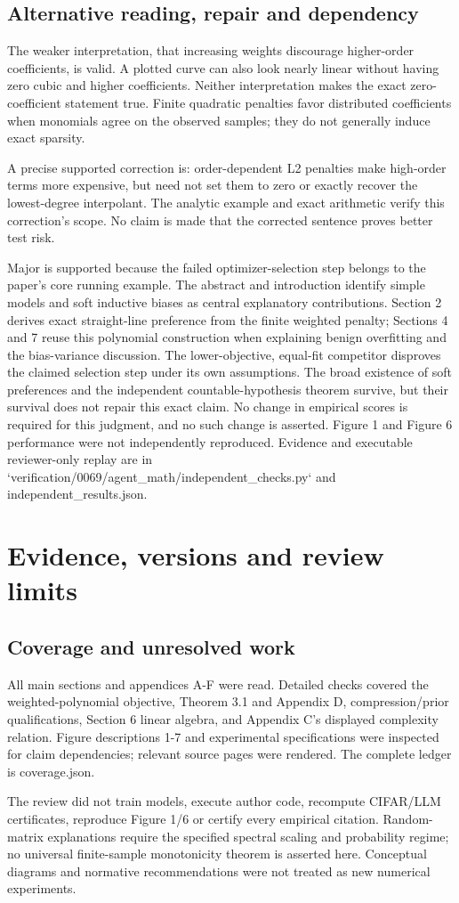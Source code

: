 \documentclass[10pt]{article}
\begin{document}
\subsection*{Alternative reading, repair and dependency}
The weaker interpretation, that increasing weights discourage higher-order coefficients, is valid. A plotted curve can also look nearly linear without having zero cubic and higher coefficients. Neither interpretation makes the exact zero-coefficient statement true. Finite quadratic penalties favor distributed coefficients when monomials agree on the observed samples; they do not generally induce exact sparsity.\par
A precise supported correction is: order-dependent L2 penalties make high-order terms more expensive, but need not set them to zero or exactly recover the lowest-degree interpolant. The analytic example and exact arithmetic verify this correction’s scope. No claim is made that the corrected sentence proves better test risk.\par
Major is supported because the failed optimizer-selection step belongs to the paper’s core running example. The abstract and introduction identify simple models and soft inductive biases as central explanatory contributions. Section 2 derives exact straight-line preference from the finite weighted penalty; Sections 4 and 7 reuse this polynomial construction when explaining benign overfitting and the bias-variance discussion. The lower-objective, equal-fit competitor disproves the claimed selection step under its own assumptions. The broad existence of soft preferences and the independent countable-hypothesis theorem survive, but their survival does not repair this exact claim. No change in empirical scores is required for this judgment, and no such change is asserted. Figure 1 and Figure 6 performance were not independently reproduced. Evidence and executable reviewer-only replay are in `verification/0069/agent\_math/independent\_checks.py` and independent\_results.json.\par
\section*{Evidence, versions and review limits}
\subsection*{Coverage and unresolved work}
All main sections and appendices A-F were read. Detailed checks covered the weighted-polynomial objective, Theorem 3.1 and Appendix D, compression/prior qualifications, Section 6 linear algebra, and Appendix C’s displayed complexity relation. Figure descriptions 1-7 and experimental specifications were inspected for claim dependencies; relevant source pages were rendered. The complete ledger is coverage.json.\par
The review did not train models, execute author code, recompute CIFAR/LLM certificates, reproduce Figure 1/6 or certify every empirical citation. Random-matrix explanations require the specified spectral scaling and probability regime; no universal finite-sample monotonicity theorem is asserted here. Conceptual diagrams and normative recommendations were not treated as new numerical experiments.\par
\end{document}
